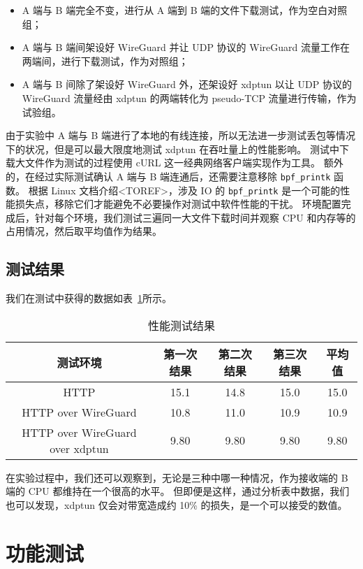 \begin{itemize}
  \item A 端与 B 端完全不变，进行从 A 端到 B 端的文件下载测试，作为空白对照组；
  \item A 端与 B 端间架设好 WireGuard 并让 UDP 协议的 WireGuard 流量工作在两端间，进行下载测试，作为对照组；
  \item A 端与 B 间除了架设好 WireGuard 外，还架设好 xdptun 以让 UDP 协议的 WireGuard 流量经由 xdptun 的两端转化为 pseudo-TCP 流量进行传输，作为试验组。
\end{itemize}

由于实验中 A 端与 B 端进行了本地的有线连接，所以无法进一步测试丢包等情况下的状况，但是可以最大限度地测试 xdptun 在吞吐量上的性能影响。
测试中下载大文件作为测试的过程使用 cURL 这一经典网络客户端实现作为工具。
额外的，在经过实际测试确认 A 端与 B 端连通后，还需要注意移除 \texttt{bpf\_printk} 函数。
根据 Linux 文档介绍<TOREF>，涉及 IO 的 \texttt{bpf\_printk} 是一个可能的性能损失点，移除它们才能避免不必要操作对测试中软件性能的干扰。
环境配置完成后，针对每个环境，我们测试三遍同一大文件下载时间并观察 CPU 和内存等的占用情况，然后取平均值作为结果。

\subsection{测试结果}

我们在测试中获得的数据如表~\ref{tab:perf-test}所示。

\begin{table}[h]
  \centering
  \caption{性能测试结果}
  \label{tab:perf-test}
  \begin{tabular}{c c c c c}
    \toprule
    测试环境 & 第一次结果 & 第二次结果 & 第三次结果 & 平均值 \\
    \midrule
    HTTP & 15.1 & 14.8 & 15.0 & 15.0 \\
    HTTP over WireGuard & 10.8 & 11.0 & 10.9 & 10.9 \\
    HTTP over WireGuard over xdptun & 9.80 & 9.80 & 9.80 & 9.80 \\
    \bottomrule
  \end{tabular}
\end{table}

在实验过程中，我们还可以观察到，无论是三种中哪一种情况，作为接收端的 B 端的 CPU 都维持在一个很高的水平。
但即便是这样，通过分析表中数据，我们也可以发现，xdptun 仅会对带宽造成约 10\% 的损失，是一个可以接受的数值。

\section{功能测试}

